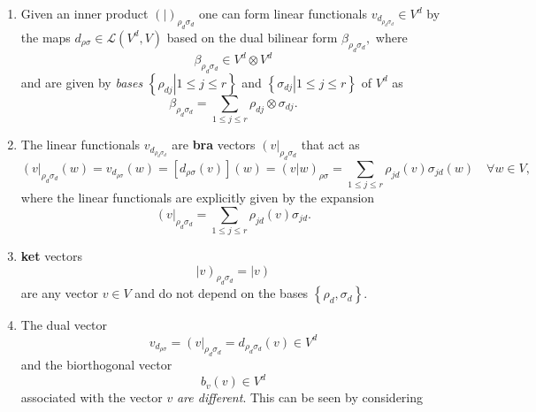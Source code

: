\documentclass[aps,preprint]{revtex4}
\begin{document}
\begin{enumerate}
\item Given an inner product $\left( \left. {}\right\vert \right) _{\rho
_{d}\sigma _{d}}$ one can form linear functionals $v_{d_{\rho _{d}\sigma
_{d}}}\in V^{d}$ by the maps $d_{\rho \sigma }\in \mathcal{L}\left(
V^{d},V\right) $ based on the dual bilinear form $\beta _{\rho _{d}\sigma
_{d}},$ where%
\begin{equation}
\beta _{\rho _{d}\sigma _{d}}\in V^{d}\otimes V^{d}
\end{equation}%
and are given by \emph{bases} $\left\{ \left. \rho _{dj}\right\vert 1\leq
j\leq r\right\} $ and $\left\{ \left. \sigma _{dj}\right\vert 1\leq j\leq
r\right\} $ of $V^{d}$ as 
\begin{equation}
\beta _{\rho _{d}\sigma _{d}}=\sum_{1\leq j\leq r}\rho _{dj}\otimes \sigma
_{dj}.
\end{equation}

\item The linear functionals $v_{d_{\rho _{d}\sigma _{d}}}$ are \textbf{bra}
vectors $\left( v\right\vert _{\rho _{d}\sigma _{d}}$ that act as 
\begin{equation}
\left( v\right\vert _{\rho _{d}\sigma _{d}}\left( w\right) =v_{d_{\rho
\sigma }}\left( w\right) =\left[ d_{\rho \sigma }\left( v\right) \right]
\left( w\right) =\left( \left. v\right\vert w\right) _{\rho \sigma
}=\sum_{1\leq j\leq r}\rho _{jd}\left( v\right) \sigma _{jd}\left( w\right)
\quad \forall w\in V,
\end{equation}%
where the linear functionals are explicitly given by the expansion 
\begin{equation}
\left( v\right\vert _{\rho _{d}\sigma _{d}}=\sum_{1\leq j\leq r}\rho
_{jd}\left( v\right) \sigma _{jd}.
\end{equation}

\item \textbf{ket }vectors 
\begin{equation}
\left\vert v\right) _{\rho _{d}\sigma _{d}}=\left\vert v\right)
\end{equation}%
are any vector $v\in V$ and do not depend on the bases $\left\{ \rho
_{d},\sigma _{d}\right\} .$

\item The dual vector 
\begin{equation}
v_{d_{\rho \sigma }}=\left( v\right\vert _{\rho _{d}\sigma _{d}}=d_{\rho
_{d}\sigma _{d}}\left( v\right) \in V^{d}
\end{equation}%
and the biorthogonal vector 
\begin{equation}
b_{v}\left( v\right) \in V^{d}
\end{equation}%
associated with the vector $v$ \emph{are different}. This can be seen by
considering


\end{enumerate}
\end{document}
